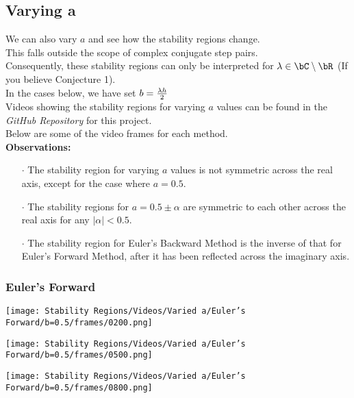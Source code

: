\subsection{Varying a}
\par We can also vary $a$ and see how the stability regions change.\\
This falls outside the scope of complex conjugate step pairs.\\
Consequently, these stability regions can only be interpreted for $\lambda \in \bC\setminus\bR$ (If you believe Conjecture 1).\\
In the cases below, we have set $b = \frac{\lambda h}{2}$\\
Videos showing the stability regions for varying $a$ values can be found in the \textit{GitHub Repository}\cite{GitHub_Repo} for this project.\\
Below are some of the video frames for each method.\\
\textbf{Observations:}
\begin{itemize}
	\item[$\cdot$] The stability region for varying $a$ values is not symmetric across the real axis, except for the case where $a = 0.5$.
	\item[$\cdot$] The stability regions for $a = 0.5 \pm \alpha$ are symmetric to each other across the real axis for any $|\alpha| < 0.5$.
	\item[$\cdot$] The stability region for Euler's Backward Method is the inverse of that for Euler's Forward Method, after it has been reflected across the imaginary axis.
\end{itemize}
\subsubsection{Euler's Forward}
\begin{multicols}{3}
	\begin{center}
		\texttt{[image: Stability Regions/Videos/Varied a/Euler's Forward/b=0.5/frames/0200.png]}
	\end{center}
	\columnbreak{}
	\begin{center}
		\texttt{[image: Stability Regions/Videos/Varied a/Euler's Forward/b=0.5/frames/0500.png]}
	\end{center}
	\columnbreak{}
	\begin{center}
		\texttt{[image: Stability Regions/Videos/Varied a/Euler's Forward/b=0.5/frames/0800.png]}
	\end{center}
\end{multicols}
